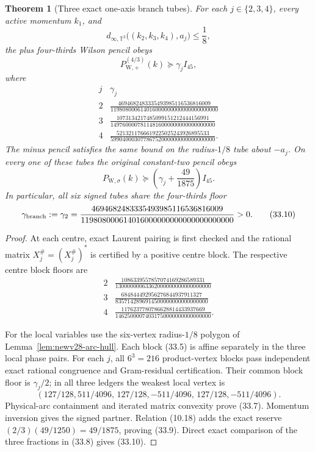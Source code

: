 \documentclass[11pt,oneside]{article}
\newtheorem{theorem}{Theorem}[section]
\theoremstyle{definition}
\theoremstyle{remark}
\begin{document}
\begin{theorem}[Three exact one-axis branch tubes]
\label{thm:newv33-branches}
For each \(j\in\{2,3,4\}\), every active momentum \(k_1\), and
\[
 d_{\infty,\mathbb T^3}
 \bigl((k_2,k_3,k_4),a_j\bigr)\le\frac18,               \tag{33.6}
\]
the plus four-thirds Wilson pencil obeys
\[
 P_{\mathrm W,+}^{(4/3)}(k)\succeq\gamma_j I_{45},     \tag{33.7}
\]
where
\[
\begin{array}{c|c}
j&\gamma_j\\ \hline
2&
\displaystyle
\frac{4694682483335493985116536816009}
{119808000614016000000000000000000000}\\[6pt]
3&
\displaystyle
\frac{1073134217485099151212444156991}
{14976000078114816000000000000000000}\\[6pt]
4&
\displaystyle
\frac{5213211766619225025243926895533}
{59904000307786752000000000000000000}.
\end{array}                                             \tag{33.8}
\]
The minus pencil satisfies the same bound on the radius-\(1/8\)
tube about \(-a_j\).  On every one of these tubes the original
constant-two pencil obeys
\[
 P_{\mathrm W,\sigma}(k)\succeq
 \left(\gamma_j+\frac{49}{1875}\right)I_{45}.           \tag{33.9}
\]
In particular, all six signed tubes share the four-thirds floor
\[
 \gamma_{\rm branch}:=\gamma_2
 =
\frac{4694682483335493985116536816009}
{119808000614016000000000000000000000}>0.              \tag{33.10}
\]
\end{theorem}

\begin{proof}
At each centre, exact Laurent pairing is first checked and the
rational matrix \(X_j^\#=(X_j^\#)^*\) is certified by a positive
centre block.  The respective centre block floors are
\[
\begin{array}{c|c}
2&\displaystyle
\frac{1086339557857074169286589331}
{13000000063362000000000000000000}\\[5pt]
3&\displaystyle
\frac{684844492956276844937911327}
{8357142896914500000000000000000}\\[5pt]
4&\displaystyle
\frac{1176237780786628814433937669}
{14625000074031750000000000000000}.
\end{array}                                             \tag{33.11}
\]

For the local variables use the six-vertex radius-\(1/8\) polygon
of Lemma~\ref{lem:newv28-arc-hull}.  Each block (33.5) is affine
separately in the three local phase pairs.  For each \(j\), all
\(6^3=216\) product-vertex blocks pass independent exact rational
congruence and Gram-residual certification.  Their common block
floor is \(\gamma_j/2\); in all three ledgers the weakest local
vertex is
\[
 (127/128,511/4096,\,
  127/128,-511/4096,\,
  127/128,-511/4096).                                  \tag{33.12}
\]
Physical-arc containment and iterated matrix convexity prove
(33.7).  Momentum inversion gives the signed partner.  Relation
(10.18) adds the exact reserve
\((2/3)(49/1250)=49/1875\), proving (33.9).
Direct exact comparison of the three fractions in (33.8) gives
(33.10).
\end{proof}
\end{document}
